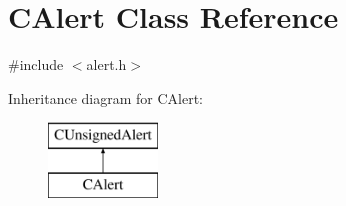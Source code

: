 \hypertarget{class_c_alert}{}\section{C\+Alert Class Reference}
\label{class_c_alert}


{\ttfamily \#include $<$alert.\+h$>$}

Inheritance diagram for C\+Alert\+:\begin{figure}[H]
\begin{center}
\leavevmode
\includegraphics[height=2.000000cm]{class_c_alert}
\end{center}
\end{figure}
